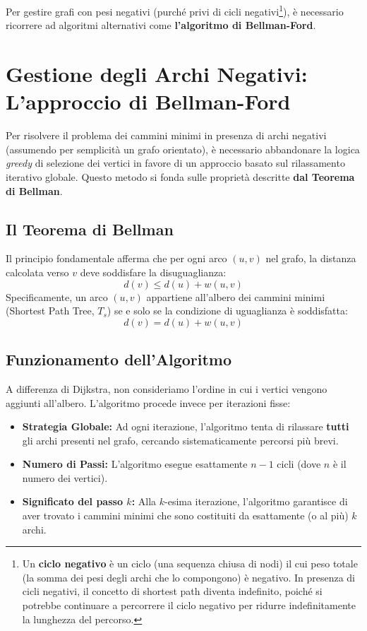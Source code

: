 \noindent
Per gestire grafi con pesi negativi (purché privi di cicli negativi\footnote{
    Un \textbf{ciclo negativo} è un ciclo (una sequenza chiusa di nodi) il cui peso totale (la somma dei pesi degli archi che lo compongono) è negativo. In presenza di cicli negativi, il concetto di shortest path diventa indefinito, poiché si potrebbe continuare a percorrere il ciclo negativo per ridurre indefinitamente la lunghezza del percorso.
}), è necessario ricorrere ad algoritmi alternativi come \textbf{l'algoritmo di Bellman-Ford}.

\clearpage
\section*{Gestione degli Archi Negativi: L'approccio di Bellman-Ford}
Per risolvere il problema dei cammini minimi in presenza di archi negativi (assumendo per semplicità un grafo orientato), è necessario abbandonare la logica \emph{greedy} di selezione dei vertici in favore di un approccio basato sul rilassamento iterativo globale. Questo metodo si fonda sulle proprietà descritte \textbf{dal Teorema di Bellman}.

\subsection*{Il Teorema di Bellman}
Il principio fondamentale afferma che per ogni arco $(u, v)$ nel grafo, la distanza calcolata verso $v$ deve soddisfare la disuguaglianza:
\[
d(v) \le d(u) + w(u, v) 
\]
Specificamente, un arco $(u, v)$ appartiene all'albero dei cammini minimi (Shortest Path Tree, $T_s$) se e solo se la condizione di uguaglianza è soddisfatta:
\[
d(v) = d(u) + w(u, v)
\]

\subsection*{Funzionamento dell'Algoritmo}
A differenza di Dijkstra, non consideriamo l'ordine in cui i vertici vengono aggiunti all'albero. L'algoritmo procede invece per iterazioni fisse:
\begin{itemize}
    \item \textbf{Strategia Globale:} Ad ogni iterazione, l'algoritmo tenta di rilassare \textbf{tutti} gli archi presenti nel grafo, cercando sistematicamente percorsi più brevi.
    \item \textbf{Numero di Passi:} L'algoritmo esegue esattamente $n-1$ cicli (dove $n$ è il numero dei vertici).
    \item \textbf{Significato del passo $k$:} Alla $k$-esima iterazione, l'algoritmo garantisce di aver trovato i cammini minimi che sono costituiti da esattamente (o al più) $k$ archi.
\end{itemize}

